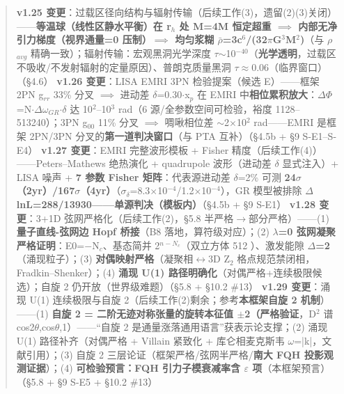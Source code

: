 \documentclass[12pt]{article}
\newcommand{\up}[1]{\ensuremath{^{#1}}}
\newcommand{\down}[1]{\ensuremath{_{#1}}}
\begin{document}
\begin{quote}
\textbf{v1.25 变更}：过载区径向结构与辐射传输（后续工作(3)，遗留(2)(3)关闭）------\textbf{等温球（线性区静水平衡）在 r\down{h} 处 M=4M 恒定超重 \ensuremath{\implies} 内部无净引力梯度（视界通量=0 压制）\ensuremath{\implies} 均匀浆糊 \ensuremath{\bar{\rho}}=3c\up{6}/(32\ensuremath{\pi}G\up{3}M\up{2})}（与 \ensuremath{\rho}\down{avg} 精确一致）；辐射传输：宏观黑洞光学深度 \ensuremath{\tau}\ensuremath{\sim}10\up{-40}（\textbf{光学透明}，过载区不吸收/不发射辐射的定量原因）、普朗克质量黑洞 \ensuremath{\tau}\ensuremath{\approx}0.06（临界窗口）（\S{}4.6）
\textbf{v1.26 变更}：LISA EMRI 3PN 检验提案（候选 E）------框架 2PN g\down{rr} 33\% 分叉 \ensuremath{\implies} 进动差 \ensuremath{\delta}=0.30\ensuremath{\cdot}x\down{p} 在 EMRI 中\textbf{相位累积放大}：\ensuremath{\Delta}\ensuremath{\Phi}=N\ensuremath{\cdot}\ensuremath{\Delta}\ensuremath{\omega}\down{GR}\ensuremath{\cdot}\ensuremath{\delta} 达 10\up{2}--10\up{3} rad（6 源/全参数空间可检验，裕度 1128--513240）；3PN g\down{00} 11\% 分叉 \ensuremath{\implies} 啁啾相位差 \ensuremath{\sim}2\ensuremath{\times}10\up{2} rad------EMRI 是框架 2PN/3PN 分叉的\textbf{第一道判决窗口}（与 PTA 互补）（\S{}4.5b + \S{}9 S-E1--S-E4）
\textbf{v1.27 变更}：EMRI 完整波形模板 + Fisher 精度（后续工作(4)）------Peters--Mathews 绝热演化 + quadrupole 波形（进动差 \ensuremath{\delta} 显式注入）+ LISA 噪声 + \textbf{7 参数 Fisher 矩阵}：代表源进动差 \ensuremath{\delta}=2\% 可测 \textbf{24\ensuremath{\sigma}（2yr）/167\ensuremath{\sigma}（4yr）}（\ensuremath{\sigma}\down{\delta{}}=8.3\ensuremath{\times}10\up{-4}/1.2\ensuremath{\times}10\up{-4}），GR 模型被排除 \textbf{\ensuremath{\Delta}lnL=288/13930------单源判决（模板内）}（\S{}4.5b + \S{}9 S-E1）
\textbf{v1.28 变更}：3+1D 弦网严格化（后续工作(2)，\S{}5.8 半严格\ensuremath{\to}部分严格）------(1) \textbf{量子直线-弦网边 Hopf 桥接}（B8 落地，算符级对应）；(2) \textbf{\ensuremath{\lambda}=0 弦网凝聚严格证明}：E0=\ensuremath{-}N\down{c}、基态简并 2\up{n-N\down{c}}（双立方体 512 \checkmark）、激发能隙 \textbf{\ensuremath{\Delta}=2}（涌现粒子）；(3) \textbf{对偶映射严格}（凝聚相\ensuremath{\leftrightarrow}3D Z\down{2} 格点规范禁闭相，Fradkin--Shenker）；(4) \textbf{涌现 U(1) 路径明确化}（对偶严格+连续极限候选）；自旋 2 仍开放（世界级难题）（\S{}5.8 + \S{}10.2 \#13）
\textbf{v1.29 变更}：涌现 U(1) 连续极限与自旋 2（后续工作(2)剩余；参考\textbf{本框架自旋 2 机制}）------(1) \textbf{自旋 2 = 二阶无迹对称张量的旋转本征值 \ensuremath{\pm}2（严格验证}，D\up{2} 谱 {cos2\ensuremath{\theta},cos\ensuremath{\theta},1}）------“自旋 2 是通量涨落通用语言”获表示论支撑；(2) 涌现 U(1) 路径补齐（对偶严格 + Villain 紧致化 + 库仑相麦克斯韦 \ensuremath{\omega}=|k|，文献引用）；(3) 自旋 2 三层论证（框架严格/弦网半严格/\textbf{南大 FQH 投影观测证据}）；(4) \textbf{可检验预言：FQH 引力子模衰减率含 \ensuremath{\varepsilon} 项}（本框架预言）（\S{}5.8 + \S{}9 S-E5 + \S{}10.2 \#13）

\end{quote}
\end{document}

